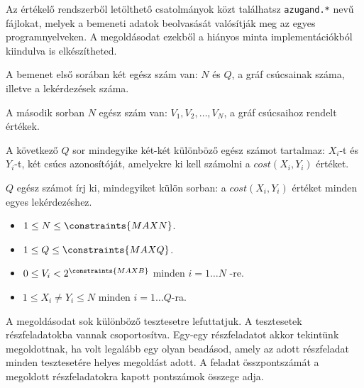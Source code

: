 \begin{warning}
Az értékelő rendszerből letölthető csatolmányok közt találhatsz
\texttt{azugand.*} nevű fájlokat, melyek a bemeneti adatok beolvasását valósítják meg az egyes programnyelveken.
A megoldásodat ezekből a hiányos minta implementációkból kiindulva is elkészítheted.
\end{warning}

\InputFile

A bemenet első sorában két egész szám van: $N$ és $Q$, a gráf csúcsainak száma, illetve a lekérdezések száma.


A második sorban $N$ egész szám van: $V_1, V_2, \dots, V_N$, a gráf csúcsaihoz rendelt értékek.


A  következő $Q$ sor mindegyike két-két különböző egész számot tartalmaz: $X_i$-t és $Y_i$-t, két csúcs azonosítóját, amelyekre ki kell számolni a $cost(X_i, Y_i)$ értéket.

\OutputFile
$Q$ egész számot írj ki, mindegyiket külön sorban: a $cost(X_i, Y_i)$ értéket minden egyes lekérdezéshez.

\Constraints
\begin{itemize}[nolistsep, itemsep=2mm]
	\item $1 \le N \le \constraints{MAXN}$.
	\item $1 \le Q \le \constraints{MAXQ}$.
	\item $0 \le V_i < 2^{\constraints{MAXB}}$ minden $i = 1\ldots N$ -re.
	\item $1 \le X_i \neq Y_i \le N$ minden $i = 1\ldots Q$-ra.
\end{itemize}

\Scoring
A megoldásodat sok különböző tesztesetre lefuttatjuk. A tesztesetek részfeladatokba vannak csoportosítva. Egy-egy részfeladatot akkor tekintünk megoldottnak, ha volt legalább egy olyan beadásod, amely az adott részfeladat minden tesztesetére helyes megoldást adott.
A feladat összpontszámát a megoldott részfeladatokra kapott pontszámok összege adja.

